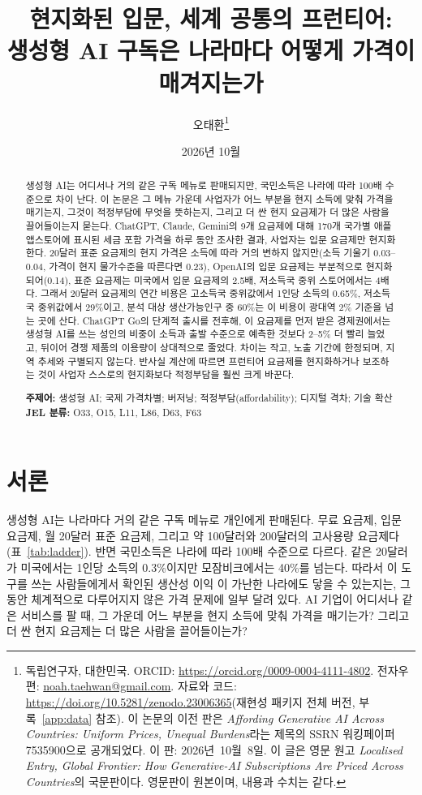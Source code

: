 \documentclass[11pt]{article}
\title{\textbf{현지화된 입문, 세계 공통의 프런티어:\\ 생성형 AI 구독은 나라마다 어떻게 가격이 매겨지는가}}
\author{오태환\thanks{독립연구자, 대한민국. ORCID: \href{https://orcid.org/0009-0004-4111-4802}{https://orcid.org/0009-0004-4111-4802}. 전자우편: \href{mailto:noah.taehwan@gmail.com}{noah.taehwan@gmail.com}. 자료와 코드: \href{https://doi.org/10.5281/zenodo.23006365}{https://doi.org/10.5281/zenodo.23006365}(재현성 패키지 전체 버전, 부록~\ref{app:data} 참조). 이 논문의 이전 판은 \textit{Affording Generative AI Across Countries: Uniform Prices, Unequal Burdens}라는 제목의 SSRN 워킹페이퍼 7535900으로 공개되었다. 이 판: \mbox{2026년 10월 8일}. 이 글은 영문 원고 \textit{Localised Entry, Global Frontier: How Generative-AI Subscriptions Are Priced Across Countries}의 국문판이다. 영문판이 원본이며, 내용과 수치는 같다.}}
\date{2026년 10월}
\theoremstyle{definition}
\theoremstyle{remark}
\begin{document}
\maketitle

\begin{abstract}
\noindent 생성형 AI는 어디서나 거의 같은 구독 메뉴로 판매되지만, 국민소득은 나라에 따라 100배 수준으로 차이 난다. 이 논문은 그 메뉴 가운데 사업자가 어느 부분을 현지 소득에 맞춰 가격을 매기는지, 그것이 적정부담에 무엇을 뜻하는지, 그리고 더 싼 현지 요금제가 더 많은 사람을 끌어들이는지 묻는다. ChatGPT, Claude, Gemini의 9개 요금제에 대해 170개 국가별 애플 앱스토어에 표시된 세금 포함 가격을 하루 동안 조사한 결과, 사업자는 입문 요금제만 현지화한다. 20달러 표준 요금제의 현지 가격은 소득에 따라 거의 변하지 않지만(소득 기울기 0.03--0.04, 가격이 현지 물가수준을 따른다면 0.23), OpenAI의 입문 요금제는 부분적으로 현지화되어(0.14), 표준 요금제는 미국에서 입문 요금제의 2.5배, 저소득국 중위 스토어에서는 4배다. 그래서 20달러 요금제의 연간 비용은 고소득국 중위값에서 1인당 소득의 0.65\%, 저소득국 중위값에서 29\%이고, 분석 대상 생산가능인구 중 60\%는 이 비용이 광대역 2\% 기준을 넘는 곳에 산다. ChatGPT Go의 단계적 출시를 전후해, 이 요금제를 먼저 받은 경제권에서는 생성형 AI를 쓰는 성인의 비중이 소득과 출발 수준으로 예측한 것보다 2--5\% 더 빨리 늘었고, 뒤이어 경쟁 제품의 이용량이 상대적으로 줄었다. 차이는 작고, 노출 기간에 한정되며, 지역 추세와 구별되지 않는다. 반사실 계산에 따르면 프런티어 요금제를 현지화하거나 보조하는 것이 사업자 스스로의 현지화보다 적정부담을 훨씬 크게 바꾼다.

\medskip
\noindent\textbf{주제어:} 생성형 AI; 국제 가격차별; 버저닝; 적정부담(affordability); 디지털 격차; 기술 확산\\
\noindent\textbf{JEL 분류:} O33, O15, L11, L86, D63, F63
\end{abstract}

\newpage
\section{서론}\label{sec:intro}

생성형 AI는 나라마다 거의 같은 구독 메뉴로 개인에게 판매된다. 무료 요금제, 입문 요금제, 월 20달러 표준 요금제, 그리고 약 100달러와 200달러의 고사용량 요금제다(표~\ref{tab:ladder}). 반면 국민소득은 나라에 따라 100배 수준으로 다르다. 같은 20달러가 미국에서는 1인당 소득의 0.3\%이지만 모잠비크에서는 40\%를 넘는다. 따라서 이 도구를 쓰는 사람들에게서 확인된 생산성 이익 \citep{brynjolfsson2025generative,noy2023experimental,dellacqua2023navigating,peng2023impact}이 가난한 나라에도 닿을 수 있는지는, 그동안 체계적으로 다루어지지 않은 가격 문제에 일부 달려 있다. AI 기업이 어디서나 같은 서비스를 팔 때, 그 가운데 어느 부분을 현지 소득에 맞춰 가격을 매기는가? 그리고 더 싼 현지 요금제는 더 많은 사람을 끌어들이는가?
\end{document}
